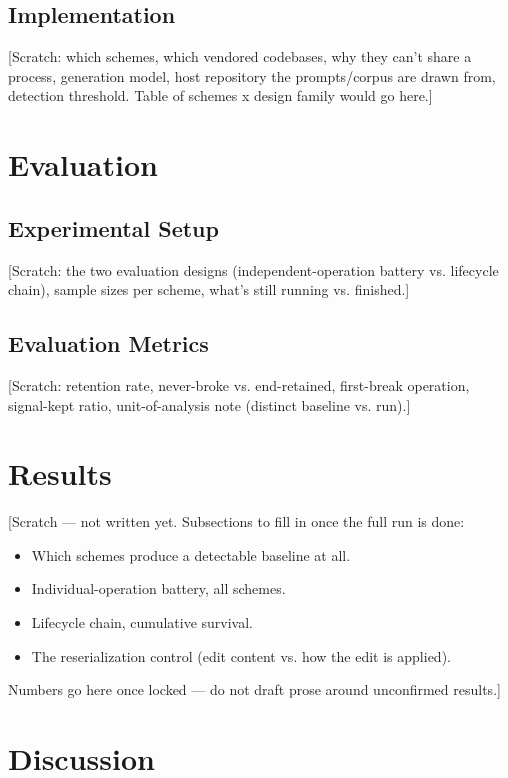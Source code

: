 \documentclass[acmsmall,screen,review,anonymous]{acmart}
\begin{document}
\subsection{Implementation}
[Scratch: which schemes, which vendored codebases, why they can't share a process, generation
model, host repository the prompts/corpus are drawn from, detection threshold. Table of schemes x
design family would go here.]


\section{Evaluation}

\subsection{Experimental Setup}
[Scratch: the two evaluation designs (independent-operation battery vs. lifecycle chain), sample
sizes per scheme, what's still running vs. finished.]

\subsection{Evaluation Metrics}
[Scratch: retention rate, never-broke vs. end-retained, first-break operation, signal-kept ratio,
unit-of-analysis note (distinct baseline vs. run).]


\section{Results}
\label{sec:results}

[Scratch --- not written yet. Subsections to fill in once the full run is done:
\begin{itemize}
    \item Which schemes produce a detectable baseline at all.
    \item Individual-operation battery, all schemes.
    \item Lifecycle chain, cumulative survival.
    \item The reserialization control (edit content vs. how the edit is applied).
\end{itemize}
Numbers go here once locked --- do not draft prose around unconfirmed results.]


\section{Discussion}
\end{document}
